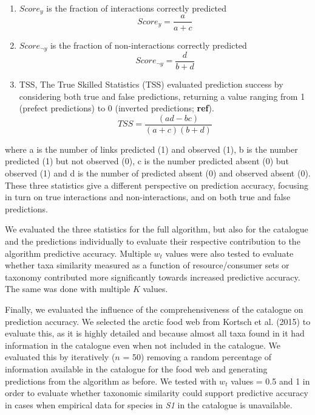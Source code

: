 \documentclass[letterpaper]{article}
\begin{document}
\begin{enumerate}
 \item $Score_y$ is the fraction of interactions correctly predicted
     \begin{equation}
         Score_y = \frac{a}{a + c}
     \end{equation}

 \item $Score_{\neg y}$ is the fraction of non-interactions correctly predicted
     \begin{equation}
       Score_{\neg y}  = \frac{d}{b + d}
     \end{equation}

 \item TSS, The True Skilled Statistics (TSS) evaluated prediction success by considering both true and false predictions, returning a value ranging from 1 (prefect predictions) to 0 (inverted predictions; \textbf{ref}). %
     \begin{equation}
       TSS = \frac{(ad - bc)}{(a + c)(b + d)}
     \end{equation}
\end{enumerate}

where a is the number of links predicted (1) and observed (1), b is the number predicted (1) but not observed (0), c is the number predicted absent (0) but observed (1) and d is the number of predicted absent (0) and observed absent (0). These three statistics give a different perspective on prediction accuracy, focusing in turn on true interactions and non-interactions, and on both true and false predictions.

We evaluated the three statistics for the full algorithm, but also for the catalogue and the predictions individually to evaluate their respective contribution to the algorithm predictive accuracy. Multiple $w_t$ values were also tested to evaluate whether taxa similarity measured as a function of resource/consumer sets or taxonomy contributed more significantly towards increased predictive accuracy. The same was done with multiple $K$ values.

Finally, we evaluated the influence of the comprehensiveness of the catalogue on prediction accuracy. We selected the arctic food web from Kortsch et al. (2015) to evaluate this, as it is highly detailed and because almost all taxa found in it had information in the catalogue even when not included in the catalogue. We evaluated this by iteratively ($n$ = 50) removing a random percentage of information available in the catalogue for the food web and generating predictions from the algorithm as before. We tested with $w_t$ values = 0.5 and 1 in order to evaluate whether taxonomic similarity could support predictive accuracy in cases when empirical data for species in \textit{S1} in the catalogue is unavailable.
\end{document}
